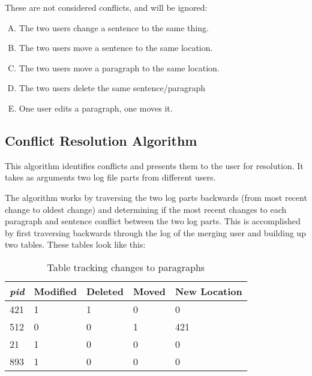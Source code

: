 These are not considered conflicts, and will be ignored:

\begin{enumerate}[A)]
\item The two users change a sentence to the same thing.

\item The two users move a sentence to the same location.

\item The two users move a paragraph to the same location.

\item The two users delete the same sentence/paragraph

\item One user edits a paragraph, one moves it.
\end{enumerate}

\subsection{Conflict Resolution Algorithm}
This algorithm identifies conflicts and presents them to the user for resolution.
It takes as arguments two log file parts from different users.

The algorithm works by traversing the two log parts backwards (from most recent change
to oldest change) and determining if the most recent changes to each paragraph and sentence
conflict between the two log parts. This is accomplished by first traversing backwards
through the log of the merging user and building up two tables. These tables look like this:

\begin{table}[h!]
\begin{center}
 \begin{tabular} {|l|l|l|l|l|}
  \hline
   \emph{pid} & Modified & Deleted & Moved & New Location \\
  \hline \hline
    421 & 1 & 1 & 0 & 0 \\
   \hline
    512 & 0 & 0 & 1 & 421 \\
   \hline
    21 & 1 & 0 & 0 & 0 \\
   \hline
    893 & 1 & 0 & 0 & 0 \\
   \hline
 \end{tabular}
\end{center}
\caption{Table tracking changes to paragraphs}
\label{table:paragraph_table}
\end{table}

